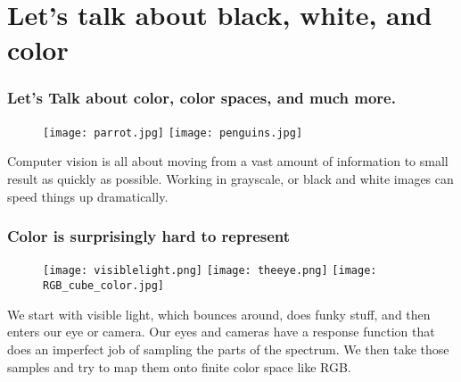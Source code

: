 \documentclass[compress]{beamer}
\begin{document}
\section{Let's talk about black, white, and color}
\begin{frame}
\frametitle{Let's Talk about color, color spaces, and much more.}
 \begin{figure}
     \texttt{[image: parrot.jpg]}
     \quad
     \texttt{[image: penguins.jpg]}
 \end{figure}
Computer vision is all about moving from a vast amount of
information to small result as quickly as possible. Working in
grayscale, or black and white images can speed things up
dramatically. 
\end{frame}

\begin{frame}
\frametitle{Color is surprisingly hard to represent}
 \begin{figure}
     \texttt{[image: visiblelight.png]}
     \quad
     \texttt{[image: theeye.png]}
     \quad
     \texttt{[image: RGB\_cube\_color.jpg]}
 \end{figure}
We start with visible light, which bounces around, does funky stuff, and then enters our
eye or camera. Our eyes and cameras have a response function that does
an imperfect job of sampling the parts of the spectrum. We then take
those samples and try to map them onto finite color space like RGB. 
\end{frame}
\end{document}
